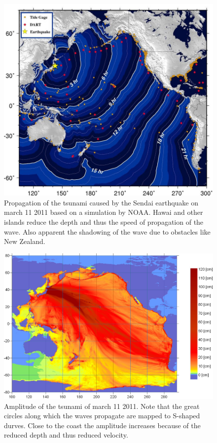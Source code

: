 \begin{figure}
\begin{center}
\includegraphics[width=\hsize]{../common/graphics/sendainoaa}
\end{center}
\caption{
Propagation of the tsunami caused by the Sendai earthquake on march 11 2011
based on a simulation by NOAA.
Hawai and other islands reduce the depth and thus the speed of propagation
of the wave.
Also apparent the shadowing of the wave due to obstacles like New Zealand.
\label{tsunamiausbreitung}}
\end{figure}

\begin{figure}
\begin{center}
\includegraphics[width=\hsize]{../common/graphics/sendaienergy}
\end{center}
\caption{
Amplitude of the tsunami of march 11 2011.
Note that the great circles along which the waves propagate are mapped
to S-shaped durves.
Close to the coast the amplitude increases because of the reduced depth
and thus reduced velocity.
\label{tsunamienergie}}
\end{figure}

